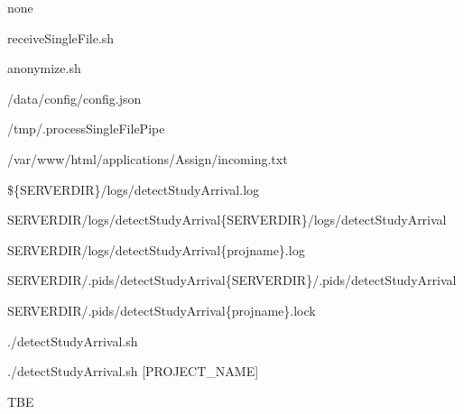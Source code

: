 \documentclass[letterpaper,10pt,english]{sphinxmanual}
\begin{document}
\sphinxAtStartPar
{}

\begin{DUlineblock}{0em}
\item[] \sphinxhyphen{}  none
\item[] \sphinxhyphen{} 
\item[]
\begin{DUlineblock}{\DUlineblockindent}
\item[] \sphinxhyphen{} receiveSingleFile.sh
\item[] \sphinxhyphen{} anonymize.sh
\item[] \sphinxhyphen{} /data/config/config.json
\item[] \sphinxhyphen{} /tmp/.processSingleFilePipe
\item[] \sphinxhyphen{} /var/www/html/applications/Assign/incoming.txt
\end{DUlineblock}
\item[] \sphinxhyphen{} 
\item[]
\begin{DUlineblock}{\DUlineblockindent}
\item[] \sphinxhyphen{} \$\{SERVERDIR\}/logs/detectStudyArrival.log
\item[] \sphinxhyphen{} SERVERDIR/logs/detectStudyArrival\{SERVERDIR\}/logs/detectStudyArrival
\item[] \sphinxhyphen{} SERVERDIR/logs/detectStudyArrival\{projname\}.log
\end{DUlineblock}
\item[] \sphinxhyphen{} 
\item[]
\begin{DUlineblock}{\DUlineblockindent}
\item[] \sphinxhyphen{} SERVERDIR/.pids/detectStudyArrival\{SERVERDIR\}/.pids/detectStudyArrival
\item[] \sphinxhyphen{} SERVERDIR/.pids/detectStudyArrival\{projname\}.lock
\end{DUlineblock}
\item[] \sphinxhyphen{} 
\item[]
\begin{DUlineblock}{\DUlineblockindent}
\item[] \sphinxhyphen{} ./detectStudyArrival.sh
\item[] \sphinxhyphen{} ./detectStudyArrival.sh {[}PROJECT\_NAME{]}
\end{DUlineblock}
\item[] \sphinxhyphen{}  TBE
\end{DUlineblock}
\end{document}
